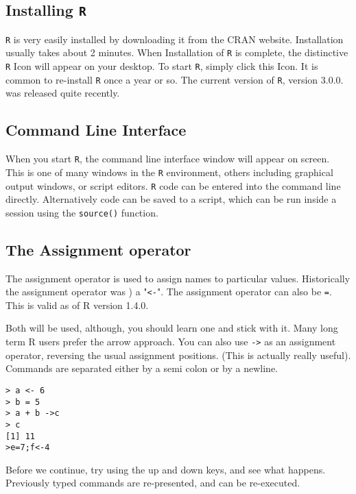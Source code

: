 \documentclass[a4paper,12pt]{article}
\begin{document}
\subsection{Installing \texttt{R}}
\texttt{R} is very easily installed by downloading it from the CRAN website. Installation usually takes about 2 minutes. When Installation of \texttt{R} is complete, the distinctive \texttt{R} Icon will appear on your desktop. To start \texttt{R}, simply click this Icon. It is common to re-install \texttt{R} once a year or so. The current version of \texttt{R}, version 3.0.0. was released quite recently.
\subsection{Command Line Interface}
When you start \texttt{R}, the command line interface window will appear on screen. This is one of many windows in the \texttt{R} environment, others including graphical output windows, or script editors. 
\texttt{R} code can be entered into the command line directly. Alternatively code can be saved to a script, which can be run inside a session using the \texttt{source()} function.



\subsection{The Assignment operator}
The assignment operator is used to assign names to particular values.
Historically the assignment operator was ) a "\texttt{<-}".
The assignment operator can also be \texttt{=}. This is valid as of R version 1.4.0. 

Both will be used, although, you should learn one and stick with it.
Many long term R users prefer the arrow approach.
You can also use \texttt{->} as an assignment operator, reversing the usual assignment positions. (This is actually really useful).
Commands are separated either by a semi colon or by a newline.
\begin{framed}
\begin{verbatim}
> a <- 6
> b = 5
> a + b ->c
> c
[1] 11
>e=7;f<-4
\end{verbatim}
\end{framed}

Before we continue, try using the up and down keys, and see what happens. Previously typed commands are re-presented, and can be re-executed.
\end{document}
